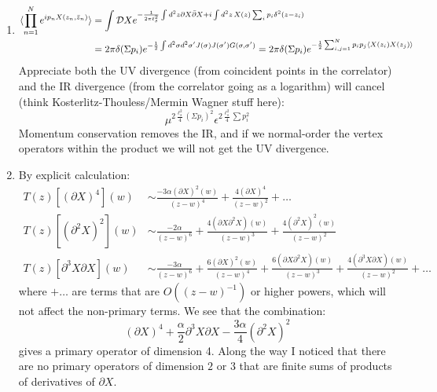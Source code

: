 \documentclass[11pt]{article}
\begin{document}
\begin{enumerate}
	
	\item 
	\[
	\begin{aligned}
		\braket{\prod_{n=1}^N e^{i p_n X(z_n, \bar z_n)}} &= \int \mathcal DX e^{-\frac{1}{2\pi \ell_s^2} \int d^2 z \partial X \bar \partial X + i \int d^2 z \, X(z)  \sum_i p_i \delta^2(z-z_i)}\\ &= 2 \pi \delta(\Sigma p_i) e^{-\frac12 \int d^2 \sigma d^2 \sigma' J(\sigma) J(\sigma') G(\sigma, \sigma')} = 2 \pi \delta(\Sigma p_i) e^{-\frac12 \sum_{i,j=1}^N p_i p_j \braket{X(z_i) X(z_j)}}
	\end{aligned}
	\]
	Appreciate both the UV divergence (from coincident points in the correlator) and the IR divergence (from the correlator going as a logarithm) will cancel (think Kosterlitz-Thouless/Mermin Wagner stuff here):
	\[
		\mu^{2 \frac{\ell^2_s}{4} (\Sigma p_i)^2} \epsilon^{2 \frac{\ell_s^2}{4} \sum p_i^2}
	\]
	Momentum conservation removes the IR, and if we normal-order the vertex operators within the product we will not get the UV divergence.
	
	\item By explicit calculation:
	\[
	\begin{aligned}
		T(z) [(\partial X)^4](w) &\sim \frac{-3 \alpha (\partial X)^2(w)}{(z-w)^4} + \frac{4 (\partial X)^4}{(z-w)^2} + \dots \\
		T(z) [(\partial^2 X)^2](w) &\sim \frac{-2 \alpha}{(z-w)^6} + \frac{4 (\partial X \partial^2 X)(w)}{(z-w)^3} + \frac{4 (\partial^2 X)^2 (w)}{(z-w)^2}\\
		T(z) [\partial^3 X \partial X](w) &\sim \frac{-3 \alpha}{(z-w)^6} + \frac{6 (\partial X)^2 (w)}{(z-w)^4} + \frac{6 (\partial X \partial^2 X)(w)}{(z-w)^3} + \frac{4 (\partial^3 X \partial X) (w)}{(z-w)^2} + \dots
	\end{aligned}
	\]
	where $+ \dots$ are terms that are $O((z-w)^{-1})$ or higher powers, which will not affect the non-primary terms. We see that the combination:
	\[
		(\partial X)^4 + \frac{\alpha}{2}  \partial^3 X \partial X - \frac{3\alpha}{4} (\partial^2 X)^2
	\]
	gives a primary operator of dimension 4. Along the way I noticed that there are no primary operators of dimension $2$ or $3$ that are finite sums of products of derivatives of $\partial X$.
	

\end{enumerate}
\end{document}
